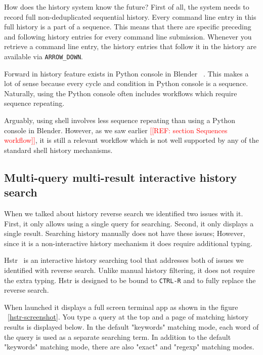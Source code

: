 \documentclass[thesis=M,english]{FITthesis}[2012/10/20]
\newcommand{\redtext}[1]{\textcolor{red}{[[#1]]}}
\let\myCite\cite
\renewcommand\cite{\unskip~\myCite}
\let\myRef\ref
\renewcommand\ref{\unskip~\myRef}
\begin{document}
How does the history system know the future? First of all, the system needs to record full non-deduplicated sequential history. Every command line entry in this full history is a part of a sequence. This means that there are specific preceding and following history entries for every command line submission. Whenever you retrieve a command line entry, the history entries that follow it in the history are available via \verb|ARROW_DOWN|.


Forward in history feature exists in Python console in Blender \cite{tools-blender-docs-python-console}. This makes a lot of sense because every cycle and condition in Python console is a sequence. Naturally, using the Python console often includes  workflows which require sequence repeating.

Arguably, using shell involves less sequence repeating than using a Python console in Blender. However, as we saw earlier \redtext{REF: section Sequences workflow}, it is still a relevant workflow which is not well supported by any of the standard shell history mechanisms.  




\subsection{Multi-query multi-result interactive history search}

When we talked about history reverse search we identified two issues with it. First, it only allows using a single query for searching. Second, it only displays a single result.
Searching history manually does not have these issues; However, since it is a non-interactive history mechanism it does require additional typing. 

Hstr\cite{toolshstr} is an interactive history searching tool that addresses both of issues we identified with reverse search. Unlike manual history filtering, it does not require the extra typing. Hstr is designed to be bound to \verb|CTRL-R| and to fully replace the reverse search.

When launched it displays a full screen terminal app as shown in the figure \ref{hstr-screenshot}. You type a query at the top and a page of matching history results is displayed below. In the default "keywords" matching mode, each word of the query is used as a separate searching term. 
In addition to the default "keywords" matching mode, there are also "exact" and "regexp" matching modes. 
\end{document}
